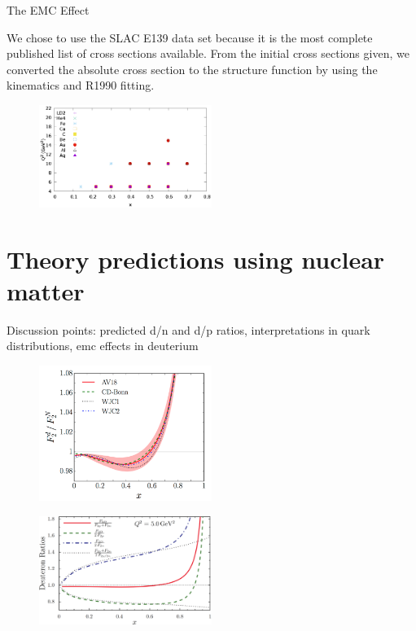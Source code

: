 \documentclass[oneside]{article}
\begin{document}
The EMC Effect



We chose to use the SLAC E139 data set because it is the most complete published list of cross sections available. From the initial cross sections given, we converted the absolute cross section to the structure function by using the kinematics and R1990 fitting. 


\begin{figure}[H]
  \centering
      	  \includegraphics[width=0.5\textwidth]{plots/F2ADdataQ2vsx.eps}
 	 \caption[]{}
  \label{fig:slac_q2x}
 \end{figure} 
 
\section{Theory predictions using nuclear matter}

Discussion points: predicted d/n and d/p ratios, interpretations in quark distributions, emc effects in deuterium


  
\begin{figure}[H]
  \centering
      	  \includegraphics[width=0.5\textwidth]{plots/dn_effects_theory.png}
 	 \caption[]{}
  \label{fig:dn_theory}
 \end{figure}  
 
\begin{figure}[H]
  \centering
      	  \includegraphics[width=0.5\textwidth]{plots/deut_ratio_theory.png}
 	 \caption[]{}
  \label{fig:deut_theory}
 \end{figure}  
  
\end{document}
